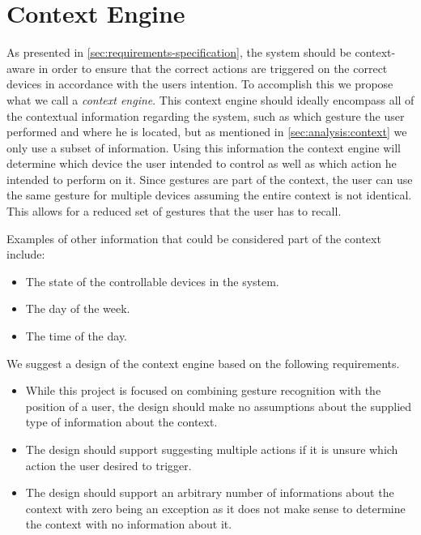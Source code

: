 \section{Context Engine}
\label{sec:analysis:context-engine}

As presented in \cref{sec:requirements-specification}, the system should be context-aware in order to ensure that the correct actions are triggered on the correct devices in accordance with the users intention.
To accomplish this we propose what we call a \emph{context engine}.
This context engine should ideally encompass all of the contextual information regarding the system, such as which gesture the user performed and where he is located, but as mentioned in \cref{sec:analysis:context} we only use a subset of information. 
Using this information the context engine will determine which device the user intended to control as well as which action he intended to perform on it.
Since gestures are part of the context, the user can use the same gesture for multiple devices assuming the entire context is not identical.
This allows for a reduced set of gestures that the user has to recall.

Examples of other information that could be considered part of the context include:

\begin{itemize}
\item The state of the controllable devices in the system.
\item The day of the week.
\item The time of the day.
\end{itemize}

We suggest a design of the context engine based on the following requirements.

\begin{itemize}
\item While this project is focused on combining gesture recognition with the position of a user, the design should make no assumptions about the supplied type of information about the context.
\item The design should support suggesting multiple actions if it is unsure which action the user desired to trigger.
\item The design should support an arbitrary number of informations about the context with zero being an exception as it does not make sense to determine the context with no information about it.
\end{itemize}


